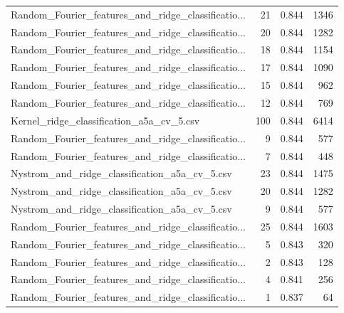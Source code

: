 \begin{tabularx}{\textwidth}{lrrr}
Random\_Fourier\_features\_and\_ridge\_classificatio... &       21 &               0.844 &          1346 \\
Random\_Fourier\_features\_and\_ridge\_classificatio... &       20 &               0.844 &          1282 \\
Random\_Fourier\_features\_and\_ridge\_classificatio... &       18 &               0.844 &          1154 \\
Random\_Fourier\_features\_and\_ridge\_classificatio... &       17 &               0.844 &          1090 \\
Random\_Fourier\_features\_and\_ridge\_classificatio... &       15 &               0.844 &           962 \\
Random\_Fourier\_features\_and\_ridge\_classificatio... &       12 &               0.844 &           769 \\
          Kernel\_ridge\_classification\_a5a\_cv\_5.csv &      100 &               0.844 &          6414 \\
Random\_Fourier\_features\_and\_ridge\_classificatio... &        9 &               0.844 &           577 \\
Random\_Fourier\_features\_and\_ridge\_classificatio... &        7 &               0.844 &           448 \\
     Nystrom\_and\_ridge\_classification\_a5a\_cv\_5.csv &       23 &               0.844 &          1475 \\
     Nystrom\_and\_ridge\_classification\_a5a\_cv\_5.csv &       20 &               0.844 &          1282 \\
     Nystrom\_and\_ridge\_classification\_a5a\_cv\_5.csv &        9 &               0.844 &           577 \\
Random\_Fourier\_features\_and\_ridge\_classificatio... &       25 &               0.844 &          1603 \\
Random\_Fourier\_features\_and\_ridge\_classificatio... &        5 &               0.843 &           320 \\
Random\_Fourier\_features\_and\_ridge\_classificatio... &        2 &               0.843 &           128 \\
Random\_Fourier\_features\_and\_ridge\_classificatio... &        4 &               0.841 &           256 \\
Random\_Fourier\_features\_and\_ridge\_classificatio... &        1 &               0.837 &            64 \\
\bottomrule
\end{tabularx}
